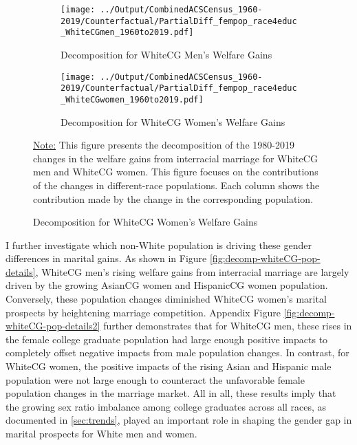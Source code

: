 \begin{figure}[H] \caption{Details on the contributions from the changes in non-White population} \label{fig:decomp-whiteCG-pop-details}

 \begin{subfigure}[b]{0.8\textwidth}
           \centering
         \texttt{[image: ../Output/CombinedACSCensus\_1960-2019/Counterfactual/PartialDiff\_fempop\_race4educ\_WhiteCGmen\_1960to2019.pdf]}
         \caption{Decomposition for WhiteCG Men's Welfare Gains}
     \end{subfigure}
	  \hfill
	   \begin{subfigure}[b]{0.8\textwidth}
           \centering
         \texttt{[image: ../Output/CombinedACSCensus\_1960-2019/Counterfactual/PartialDiff\_fempop\_race4educ\_WhiteCGwomen\_1960to2019.pdf]}
         \caption{Decomposition for WhiteCG Women's Welfare Gains}
     \end{subfigure}
    \begin{fignote}
	\underline{Note:} This figure presents the decomposition of the 1980-2019 changes in the welfare gains from interracial marriage for WhiteCG men and WhiteCG women. This figure focuses on the contributions of the changes in different-race populations. Each column shows the contribution made by the change in the corresponding population. 
\end{fignote}
	
\end{figure}


 I further investigate which non-White population is driving these gender differences in marital gains. As shown in Figure \ref{fig:decomp-whiteCG-pop-details}, WhiteCG men's rising welfare gains from interracial marriage are largely driven by the growing AsianCG women and HispanicCG women population. Conversely, these population changes diminished WhiteCG women's marital prospects by heightening marriage competition. Appendix Figure \ref{fig:decomp-whiteCG-pop-details2} further demonstrates that for WhiteCG men, these rises in the female college graduate population had large enough positive impacts to completely offset negative impacts from male population changes. In contrast, for WhiteCG women, the positive impacts of the rising Asian and Hispanic male population were not large enough to counteract the unfavorable female population changes in the marriage market. All in all, these results imply that the growing sex ratio imbalance among college graduates across all races, as documented in \ref{sec:trends}, played an important role in shaping the gender gap in marital prospects for White men and women. 









